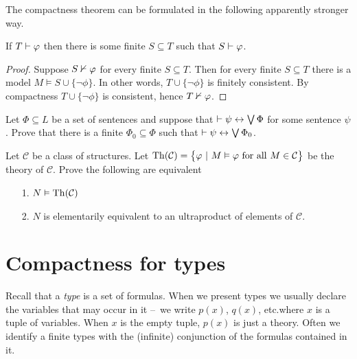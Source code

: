 The compactness theorem can be formulated in the following apparently stronger way.

\begin{corollary}\label{compattezza2}
If $T\vdash\varphi$ then there is some finite $S\subseteq T$ such that $S\vdash\varphi$.
\end{corollary}

\begin{proof}
Suppose $S\nvdash\varphi$ for every finite $S\subseteq T$. Then for every finite $S\subseteq T$ there is a model $M\models S\cup\{\neg\phi\}$. In other words, $T\cup\{\neg\phi\}$ is finitely consistent. By compactness $T\cup\{\neg\phi\}$ is consistent, hence $T\nvdash \varphi$.
\end{proof}

\begin{exercise}
Let $\Phi\subseteq L$ be a set of sentences and suppose that $\vdash\psi\leftrightarrow\bigvee\Phi$ for some sentence $\psi$. Prove that there is a finite $\Phi_0\subseteq\Phi$ such that  $\vdash\psi\leftrightarrow\bigvee\Phi_0$.
\end{exercise}

\begin{exercise}
Let ${\mathcal C}$ be a class of structures. 
Let ${\rm Th}({\mathcal C}) = \big\{\varphi\ |\ M\vDash \varphi\ \mathrm{for\ all}\ M \in {\mathcal C}\big\}$ be the theory of ${\mathcal C}$. 
Prove the following are equivalent
\begin{itemize}
\item[1.] $N\vDash{\rm Th}({\mathcal C})$
\item[2.] $N$ is elementarily equivalent to an ultraproduct of elements of ${\mathcal C}$.
\end{itemize}
\end{exercise}
\section{Compactness for types}

\def\ceq#1#2#3{\parbox{13ex}{$\displaystyle #1$}\parbox{4ex}{\hfil$#2$}$\displaystyle #3$}
 
Recall that a \emph{type\/} is a set of formulas. When we present types we usually declare the variables that may occur in it --~we write \emph{$p(x)$}, \emph{$q(x)$}, etc.\@ where $x$ is a tuple of variables.
When $x$ is the empty tuple, $p(x)$ is just a theory.
Often we identify a finite types with the (infinite) conjunction of the formulas contained in it.

